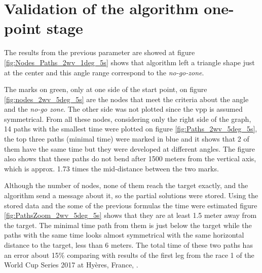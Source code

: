 \chapter{Validation of the algorithm one- point stage}

The results from the previous parameter are showed at figure \ref{fig:Nodes_Paths_2wv_1deg_5s} shows that algorithm left a triangle shape just at the center and this angle range correspond to the \textit{no-go-zone}.  \par \noindent

The marks on green, only at one side of the start point, on figure \ref{fig:nodes_2wv_5deg_5s} are the nodes that meet the criteria about the angle and the \textit{no-go zone}. The other side was not plotted %
since the \acrshort{vpp} is assumed symmetrical.%
From all these nodes, considering only the right side of the graph, 14 paths with the smallest time were plotted on figure \ref{fig:Paths_2wv_5deg_5s}, the top three paths (minimal time) were marked in blue and it shows that 2 of them have the same time but they were developed at different angles. The figure also shows that these paths do not bend after 1500 meters from the vertical axis, which is approx. 1.73 times the mid-distance between the two marks. %

Although the number of nodes, none of them reach the target exactly, and the algorithm send a message about it, so the partial solutions were stored. Using the stored data and the some of the previous formulas the time were estimated figure \ref{fig:PathsZoom_2wv_5deg_5s} shows that they are at least 1.5 meter away from the target. The minimal time path from them is just below the target while the paths with the same time looks almost symmetrical with the same horizontal distance to the target, less than 6 meters. The total time of these two paths has an error about 15\% comparing with results of the first leg from the race 1 of the World Cup Series 2017 at Hyères, France, \cite{SAPsailingana}. \par   
 
